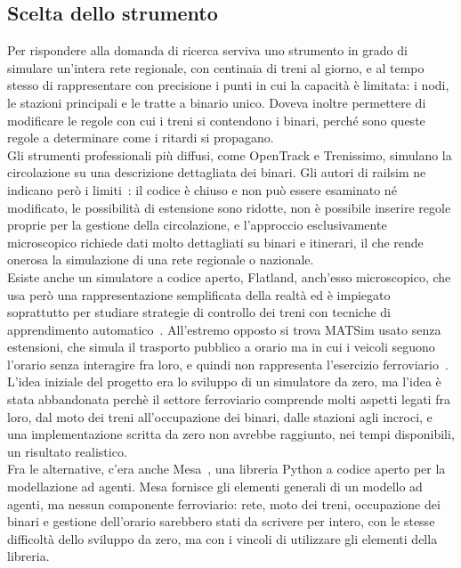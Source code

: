 \subsection{Scelta dello strumento}
Per rispondere alla domanda di ricerca serviva uno strumento in grado di simulare un'intera rete regionale, con centinaia di treni al giorno, e al tempo stesso di rappresentare con precisione i punti in cui la capacità è limitata: i nodi, le stazioni principali e le tratte a binario unico. 
Doveva inoltre permettere di modificare le regole con cui i treni si contendono i binari, perché sono queste regole a determinare come i ritardi si propagano.\\

Gli strumenti professionali più diffusi, come OpenTrack e Trenissimo, simulano la circolazione su una descrizione dettagliata dei binari. Gli autori di railsim ne indicano però i limiti~\cite{kaddoura2024railsim}: il codice è chiuso e non può essere esaminato né modificato, le possibilità di estensione sono ridotte, non è possibile inserire regole proprie per la gestione della circolazione, e l'approccio esclusivamente microscopico richiede dati molto dettagliati su binari e itinerari, il che rende onerosa la simulazione di una rete regionale o nazionale. \\
Esiste anche un simulatore a codice aperto, Flatland, anch'esso microscopico, che usa però una rappresentazione semplificata della realtà ed è impiegato soprattutto per studiare strategie di controllo dei treni con tecniche di apprendimento automatico~\cite{kaddoura2024railsim}. 
All'estremo opposto si trova MATSim usato senza estensioni, che simula il trasporto pubblico a orario ma in cui i veicoli seguono l'orario senza interagire fra loro, e quindi non rappresenta l'esercizio ferroviario~\cite{kaddoura2024railsim}.\\

L'idea iniziale del progetto era lo sviluppo di un simulatore da zero, ma l'idea è stata abbandonata perchè il settore ferroviario comprende molti aspetti legati fra loro, dal moto dei treni all'occupazione dei binari, dalle stazioni agli incroci, e una implementazione scritta da zero non avrebbe raggiunto, nei tempi disponibili, un risultato realistico.\\
Fra le alternative, c'era anche Mesa~\cite{terhoeven2025mesa}, una libreria Python a codice aperto per la modellazione ad agenti. Mesa fornisce gli elementi generali di un modello ad agenti, ma nessun componente ferroviario: rete, moto dei treni, occupazione dei binari e gestione dell'orario sarebbero stati da scrivere per intero, con le stesse difficoltà dello sviluppo da zero, ma con i vincoli di utilizzare gli elementi della libreria.\\

